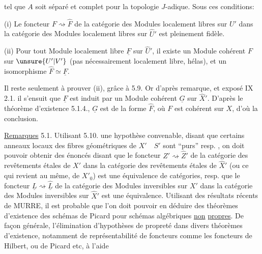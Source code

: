 tel que $A$ soit séparé et complet pour la topologie $J$-adique. Sous ces conditions:

(i) Le foncteur $F\rightsquigarrow\widehat F$ de la catégorie des Modules localement libres
sur $U'$ dans la catégorie des Modules localement libres sur $\widehat U'$ est
pleinement fidèle.

(ii) Pour tout Module localement libre $\underline F$ sur $\widehat U'$, il existe un Module
cohérent $F$ sur $\unsure{U'|V'}$ (pas nécessairement localement libre, hélas), et un
isomorphisme $\widehat F\simeq\underline F$.

Il reste seulement à prouver (ii), grâce à 5.9. Or d'après 
remarque, et exposé IX 2.1. il s'ensuit que $\underline F$ est induit par un Module
cohérent $\underline G$ sur $\widehat X'$. D'après le théorème  d'existence
5.1.4., $\underline G$ est de la forme $\widehat F$, où $F$ est cohérent sur $X$, d'où la conclusion.

\uline{Remarques} 5.1. Utilisant 5.10.
une hypothèse convenable, disant que certains anneaux locaux des fibres
géométriques de $X'\quad S'$ sont ``purs'' resp. , on doit pouvoir
obtenir des énoncés disant  que le foncteur $Z'\rightsquigarrow\widehat Z'$ de la catégorie
des revêtements étales de $X'$ dans la catégorie des revêtements étales de
$\widehat X'$  (ou ce qui revient au même, de $X'_0$) est  une
équivalence de catégories, resp. que le foncteur $\underline L\rightsquigarrow\widehat{\underline L}$ de la catégorie
des Modules inversibles sur $X'$ dans la catégorie des Modules inversibles
sur $\widehat X'$ est une équivalence. Utilisant des résultats récents de MURRE,
il est probable que l'on doit pouvoir en déduire des théorèmes d'existence
 des schémas de Picard pour  schémas algébriques  \uline{non}
\uline{propres}.  De façon générale, l'élimination d'hypothèses de propreté
dans divers théorèmes d'existence, notamment de représentabilité de
foncteurs comme les foncteurs de Hilbert, ou de Picard etc, à l'aide

